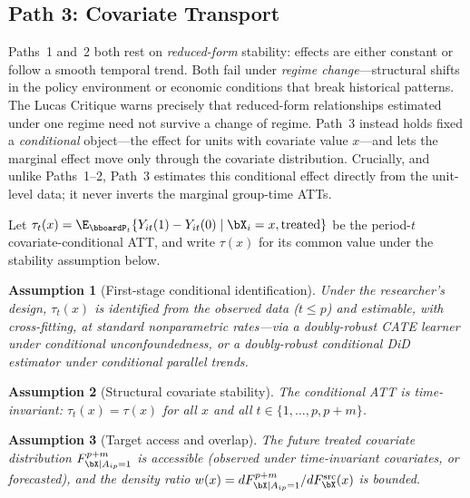 \documentclass{article}
\renewcommand{\P}{\bboardP}
\newtheorem{assumption}{Assumption}
\begin{document}
\subsection{Path 3: Covariate Transport}
\label{sec:path3}

Paths~1 and~2 both rest on \emph{reduced-form} stability: effects are either constant or follow a smooth temporal trend. Both fail under \emph{regime change}---structural shifts in the policy environment or economic conditions that break historical patterns. The Lucas Critique \citep{lucasjrEconometricPolicyEvaluation1976} warns precisely that reduced-form relationships estimated under one regime need not survive a change of regime. Path~3 instead holds fixed a \emph{conditional} object---the effect for units with covariate value $x$---and lets the marginal effect move only through the covariate distribution. Crucially, and unlike Paths~1--2, Path~3 estimates this conditional effect directly from the unit-level data; it never inverts the marginal group-time ATTs.

Let $\tau_t(x) = \E_{\P_t}\{Y_{it}(1) - Y_{it}(0) \mid \bX_i = x, \text{treated}\}$ be the period-$t$ covariate-conditional ATT, and write $\tau(x)$ for its common value under the stability assumption below.

\begin{assumption}[First-stage conditional identification]
\label{assump:cond-ident}
Under the researcher's design, $\tau_t(x)$ is identified from the observed data ($t \leq p$) and estimable, with cross-fitting, at standard nonparametric rates---via a doubly-robust CATE learner under conditional unconfoundedness, or a doubly-robust conditional DiD estimator \citep{santannaDoublyRobustDifferenceindifferences2020} under conditional parallel trends.
\end{assumption}

\begin{assumption}[Structural covariate stability]
\label{assump:covariate-stability}
The conditional ATT is time-invariant: $\tau_t(x) = \tau(x)$ for all $x$ and all $t \in \{1, \ldots, p, p+m\}$.
\end{assumption}

\begin{assumption}[Target access and overlap]
\label{assump:target}
The future treated covariate distribution $F^{p+m}_{\bX \mid A_{ip}=1}$ is accessible (observed under time-invariant covariates, or forecasted), and the density ratio $w(x) = dF^{p+m}_{\bX \mid A_{ip}=1}/dF^{\mathrm{src}}_{\bX}(x)$ is bounded.
\end{assumption}
\end{document}
